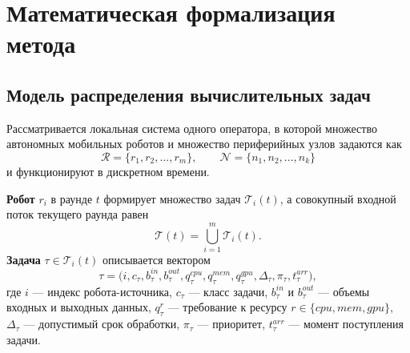 \documentclass[a4paper,14pt]{extarticle}
\begin{document}
\section{Математическая формализация метода}

\subsection{Модель распределения вычислительных задач}

Рассматривается локальная система одного оператора, в которой множество автономных мобильных роботов и множество периферийных узлов задаются как
\begin{equation}
	\mathcal{R}=\{r_1,r_2,\ldots,r_m\},\qquad
	\mathcal{N}=\{n_1,n_2,\ldots,n_k\}
	\label{eq:nir_sets}
\end{equation}
и функционируют в дискретном времени.

\textbf{Робот} $r_i$ в раунде $t$ формирует множество задач $\mathcal{T}_i(t)$, а совокупный входной поток текущего раунда равен
\begin{equation}
	\mathcal{T}(t)=\bigcup_{i=1}^{m}\mathcal{T}_i(t).
	\label{eq:nir_all_tasks}
\end{equation}
\textbf{Задача} $\tau\in\mathcal{T}_i(t)$ описывается вектором
\begin{equation}
	\tau=\bigl(i,c_{\tau},b^{in}_{\tau},b^{out}_{\tau},q^{cpu}_{\tau},q^{mem}_{\tau},q^{gpu}_{\tau},\Delta_{\tau},\pi_{\tau},t^{arr}_{\tau}\bigr),
	\label{eq:nir_task_vector}
\end{equation}
где $i$ --- индекс робота-источника, $c_\tau$ --- класс задачи, $b^{in}_\tau$ и $b^{out}_\tau$ --- объемы входных и выходных данных, $q^r_\tau$ --- требование к ресурсу $r\in\{cpu,mem,gpu\}$, $\Delta_\tau$ --- допустимый срок обработки, $\pi_\tau$ --- приоритет, $t^{arr}_\tau$ --- момент поступления задачи.
\end{document}
